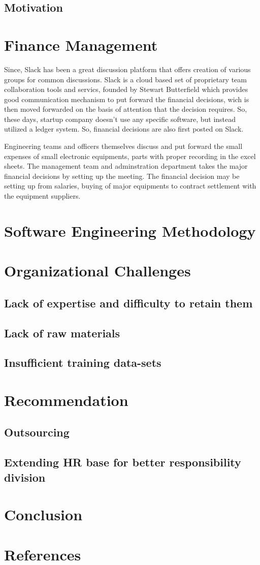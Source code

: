 \documentclass[12pt,a4paper]{scrreprt}
\begin{document}
\section{Motivation}

\chapter{Finance Management}
Since, Slack has been a great discussion platform that offers creation of various groups for common discussions. Slack is a cloud based set of proprietary team collaboration tools and servics, founded by Stewart Butterfield which provides good communication mechanism to put forward the financial decisions, wich is then moved forwarded on the basis of attention that the decision requires. So, these days, startup company doesn't use any specific software, but instead utilized a ledger system. So, financial decisions are also first posted on Slack.\par
Engineering teams and officers themselves discuss and put forward the small expenses of small electronic equipments, parts with proper recording in the excel sheets. The management team and adminstration department takes the major financial decisions by setting up the meeting. The financial decision may be setting up from salaries, buying of major equipments to contract settlement with the equipment suppliers.
\chapter{Software Engineering Methodology}

\chapter{Organizational Challenges}
\section{Lack of expertise and difficulty to retain them}
\section{Lack of raw materials}
\section{Insufficient training data-sets}

\chapter{Recommendation}
\section{Outsourcing}
\section{Extending HR base for better responsibility division}

\chapter{Conclusion}
\chapter*{References}

\end{document}
